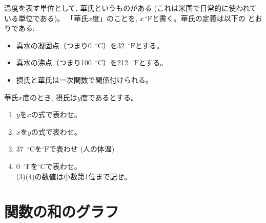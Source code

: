 \begin{q}\label{q:Fahrenheit} 温度を表す単位として, 華氏というものがある
(これは米国で日常的に使われている単位である)。
「華氏$x$度」のことを, $x\,{}^\circ\mathrm{F}$と書く。華氏の定義は以下の
とおりである:
\begin{itemize}
\item 真水の凝固点（つまり0~${}^\circ\mathrm{C}$）を32~${}^\circ\mathrm{F}$とする。
\item 真水の沸点（つまり100~${}^\circ\mathrm{C}$）を212~${}^\circ\mathrm{F}$とする。
\item 摂氏と華氏は一次関数で関係付けられる。
\end{itemize}
華氏$x$度のとき, 摂氏は$y$度であるとする。
\begin{enumerate}
\item $y$を$x$の式で表わせ。
\item $x$を$y$の式で表わせ。
\item 37~${}^\circ\mathrm{C}$を${}^\circ\mathrm{F}$で表わせ (人の体温)
\item 0~${}^\circ\mathrm{F}$を${}^\circ\mathrm{C}$で表わせ。\\
(3)(4)の数値は小数第1位まで記せ。
\end{enumerate}
\end{q}
\hv

\section{関数の和のグラフ}

